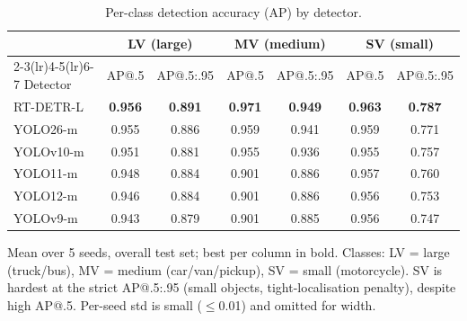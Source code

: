 \begin{table}[ht]
  \centering
  \caption{Per-class detection accuracy (AP) by detector.}
  \label{tab:perclass}
  \begin{tabular}{lcccccc}
    \toprule
    & \multicolumn{2}{c}{LV (large)} & \multicolumn{2}{c}{MV (medium)} & \multicolumn{2}{c}{SV (small)} \\
    \cmidrule(lr){2-3}\cmidrule(lr){4-5}\cmidrule(lr){6-7}
    Detector & AP@.5 & AP@.5:.95 & AP@.5 & AP@.5:.95 & AP@.5 & AP@.5:.95 \\
    \midrule
    RT-DETR-L & \textbf{0.956} & \textbf{0.891} & \textbf{0.971} & \textbf{0.949} & \textbf{0.963} & \textbf{0.787} \\
    YOLO26-m & 0.955 & 0.886 & 0.959 & 0.941 & 0.959 & 0.771 \\
    YOLOv10-m & 0.951 & 0.881 & 0.955 & 0.936 & 0.955 & 0.757 \\
    YOLO11-m & 0.948 & 0.884 & 0.901 & 0.886 & 0.957 & 0.760 \\
    YOLO12-m & 0.946 & 0.884 & 0.901 & 0.886 & 0.956 & 0.753 \\
    YOLOv9-m & 0.943 & 0.879 & 0.901 & 0.885 & 0.956 & 0.747 \\
    \bottomrule
  \end{tabular}
  \par\smallskip
  \footnotesize Mean over 5 seeds, overall test set; best per column in bold. Classes: LV = large (truck/bus), MV = medium (car/van/pickup), SV = small (motorcycle). SV is hardest at the strict AP@.5:.95 (small objects, tight-localisation penalty), despite high AP@.5. Per-seed std is small ($\leq$0.01) and omitted for width.
\end{table}
